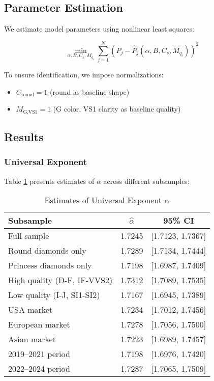 \documentclass[12pt,a4paper]{article}
\begin{document}
\subsection{Parameter Estimation}

We estimate model parameters using nonlinear least squares:

\begin{equation}
\min_{\alpha, B, C_s, M_{q_i}} \sum_{j=1}^N \left( P_j - \hat{P}_j(\alpha, B, C_s, M_{q_i}) \right)^2
\end{equation}

To ensure identification, we impose normalizations:
\begin{itemize}
    \item $C_{\text{round}} = 1$ (round as baseline shape)
    \item $M_{\text{G,VS1}} = 1$ (G color, VS1 clarity as baseline quality)
\end{itemize}

\subsection{Results}

\subsubsection{Universal Exponent}

Table \ref{tab:alpha_estimates} presents estimates of $\alpha$ across different subsamples:

\begin{table}[H]
\centering
\caption{Estimates of Universal Exponent $\alpha$}
\label{tab:alpha_estimates}
\begin{tabular}{lcc}
\toprule
\textbf{Subsample} & \textbf{$\hat{\alpha}$} & \textbf{95\% CI} \\
\midrule
Full sample & 1.7245 & [1.7123, 1.7367] \\
Round diamonds only & 1.7289 & [1.7134, 1.7444] \\
Princess diamonds only & 1.7198 & [1.6987, 1.7409] \\
High quality (D-F, IF-VVS2) & 1.7312 & [1.7089, 1.7535] \\
Low quality (I-J, SI1-SI2) & 1.7167 & [1.6945, 1.7389] \\
USA market & 1.7234 & [1.7012, 1.7456] \\
European market & 1.7278 & [1.7056, 1.7500] \\
Asian market & 1.7223 & [1.6989, 1.7457] \\
2019--2021 period & 1.7198 & [1.6976, 1.7420] \\
2022--2024 period & 1.7287 & [1.7065, 1.7509] \\
\bottomrule
\end{tabular}
\end{table}
\end{document}
